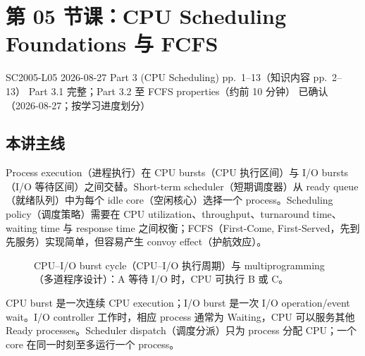 
\section{第 05 节课：CPU Scheduling Foundations 与 FCFS}
\label{lecture:SC2005-L05}

\lecturemeta
  {SC2005-L05}
  {2026-08-27}
  {Part 3 (CPU Scheduling)}
  {pp.~1--13（知识内容 pp.~2--13）}
  {Part 3.1 完整；Part 3.2 至 FCFS properties（约前 10 分钟）}
  {已确认（2026-08-27；按学习进度划分）}

\subsection{本讲主线}

Process execution（进程执行）在 CPU bursts（CPU 执行区间）与 I/O bursts（I/O 等待区间）之间交替。Short-term scheduler（短期调度器）从 ready queue（就绪队列）中为每个 idle core（空闲核心）选择一个 process。Scheduling policy（调度策略）需要在 CPU utilization、throughput、turnaround time、waiting time 与 response time 之间权衡；FCFS（First-Come, First-Served，先到先服务）实现简单，但容易产生 convoy effect（护航效应）。



\begin{figure}[htbp]
  \centering
  \resizebox{0.96\textwidth}{!}{}
  \caption{CPU--I/O burst cycle（CPU--I/O 执行周期）与 multiprogramming（多道程序设计）：A 等待 I/O 时，CPU 可执行 B 或 C。}
  \label{fig:sc2005-l05-cpu-io-bursts}
\end{figure}

CPU burst 是一次连续 CPU execution；I/O burst 是一次 I/O operation/event wait。I/O controller 工作时，相应 process 通常为 Waiting，CPU 可以服务其他 Ready processes。Scheduler dispatch（调度分派）只为 process 分配 CPU；一个 core 在同一时刻至多运行一个 process。

